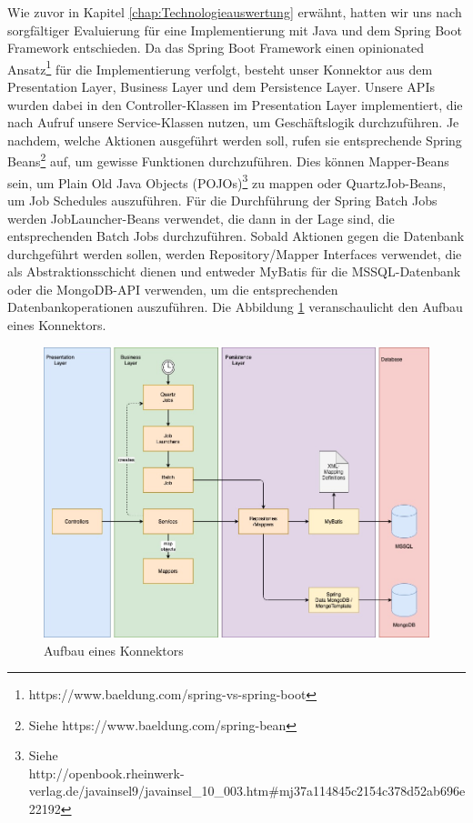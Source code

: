 Wie zuvor in Kapitel \ref{chap:Technologieauswertung} erwähnt, hatten wir uns nach sorgfältiger Evaluierung für eine Implementierung mit Java und dem Spring Boot Framework entschieden. Da das Spring Boot Framework einen opinionated Ansatz\footnote{https://www.baeldung.com/spring-vs-spring-boot} für die Implementierung verfolgt, besteht unser Konnektor aus dem Presentation Layer, Business Layer und dem Persistence Layer. Unsere APIs wurden dabei in den Controller-Klassen im Presentation Layer implementiert, die nach Aufruf unsere Service-Klassen nutzen, um Geschäftslogik durchzuführen. Je nachdem, welche Aktionen ausgeführt werden soll, rufen sie entsprechende Spring Beans\footnote{Siehe https://www.baeldung.com/spring-bean} auf, um gewisse Funktionen durchzuführen. Dies können Mapper-Beans sein, um Plain Old Java Objects (POJOs)\footnote{Siehe \\ http://openbook.rheinwerk-verlag.de/javainsel9/javainsel\_10\_003.htm\#mj37a114845c2154c378d52ab696e22192} zu mappen oder QuartzJob-Beans, um Job Schedules auszuführen. Für die Durchführung der Spring Batch Jobs werden JobLauncher-Beans verwendet, die dann in der Lage sind, die entsprechenden Batch Jobs durchzuführen. Sobald Aktionen gegen die Datenbank durchgeführt werden sollen, werden Repository/Mapper Interfaces verwendet, die als Abstraktionsschicht dienen und entweder MyBatis für die MSSQL-Datenbank oder die MongoDB-API verwenden, um die entsprechenden Datenbankoperationen auszuführen. Die Abbildung \ref{fig:Aufbau eines Konnektors} veranschaulicht den Aufbau eines Konnektors.

\begin{figure}[!h]
\centering
\includegraphics[width=15cm]{images/00_software_architecture/02_connector_structure/connector_structure.jpg}
\caption{Aufbau eines Konnektors}
\label{fig:Aufbau eines Konnektors}
\end{figure}
